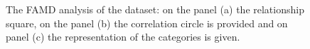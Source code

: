 \documentclass[
12pt, %
a4paper, %
oneside, %
headinclude,footinclude, %
BCOR5mm, %
]{scrartcl}
\begin{document}
\clearpage


\begin{figure}[h]
\begin{center}
\\
\\
\caption{The FAMD analysis of the dataset: on the panel (a)  the relationship square, on  the panel (b) the correlation circle is provided and on panel (c) the representation of the categories is given.}
\label{PCA+SVM_PLOT}
\end{center}
\end{figure}
\end{document}
